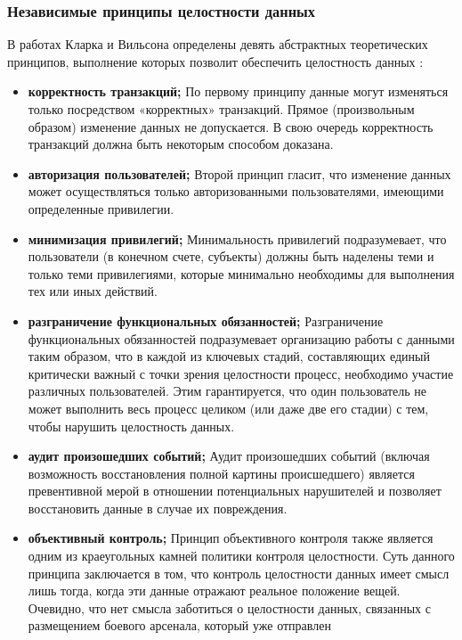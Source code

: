 \subsubsection{Независимые принципы целостности данных}
В работах Кларка и Вильсона определены девять абстрактных теоретических принципов,
выполнение которых позволит обеспечить целостность данных \autocite{Vorobyova}:
\begin{itemize}
    \item \textbf{корректность транзакций;}
    По первому принципу данные могут изменяться только посредством «корректных» транзакций.
    Прямое (произвольным образом) изменение данных не допускается. В свою очередь
    корректность транзакций должна быть некоторым способом доказана.
    \item \textbf{авторизация пользователей;}
    Второй принцип гласит, что изменение данных может осуществляться только
    авторизованными пользователями, имеющими определенные привилегии.
    \item \textbf{минимизация привилегий;}
    Минимальность привилегий подразумевает, что пользователи (в конечном счете, субъекты)
    должны быть наделены теми и только теми привилегиями, которые минимально необходимы
    для выполнения тех или иных действий.
    \item \textbf{разграничение функциональных обязанностей;}
    Разграничение функциональных обязанностей подразумевает организацию работы с данными
    таким образом, что в каждой из ключевых стадий, составляющих единый критически важный
    с точки зрения целостности процесс, необходимо участие различных пользователей.
    Этим гарантируется, что один пользователь не может выполнить весь процесс целиком
    (или даже две его стадии) с тем, чтобы нарушить целостность данных.
    \item \textbf{аудит произошедших событий;}
    Аудит произошедших событий (включая возможность восстановления полной картины происшедшего)
    является превентивной мерой в отношении потенциальных нарушителей и позволяет
    восстановить данные в случае их повреждения.
    \item \textbf{объективный контроль;}
    Принцип объективного контроля также является одним из краеугольных камней политики контроля
    целостности. Суть данного принципа заключается в том, что контроль целостности данных имеет
    смысл лишь тогда, когда эти данные отражают реальное положение вещей. Очевидно, что нет смысла
    заботиться о целостности данных, связанных с размещением боевого арсенала, который уже отправлен

\end{itemize}
